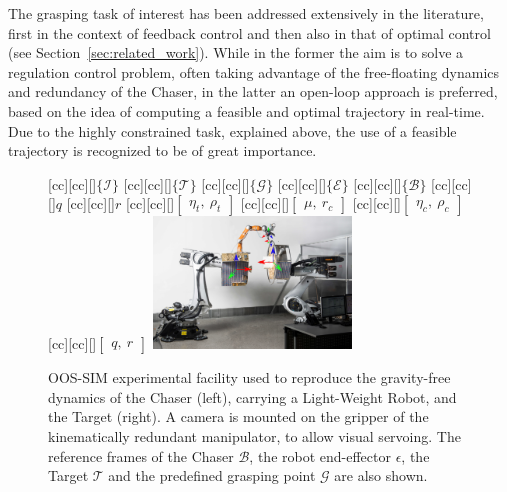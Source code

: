 The grasping task of interest has been addressed extensively in the literature, first in the context of feedback control and then also in that of optimal control (see Section~\ref{sec:related_work}). While in the former the aim is to solve a regulation control problem, often taking advantage of the free-floating dynamics and redundancy of the Chaser, in the latter an open-loop approach is preferred, based on the idea of computing a feasible and optimal trajectory in real-time. Due to the highly constrained task, explained above, the use of a feasible trajectory is recognized to be of great importance.
\begin{figure}[t!]
[cc][cc][\FontFigBBB]{{\color{white}$\{\mathcal{I}\}$}}
[cc][cc][\FontFigBBB]{{\color{black}$\{\mathcal{T}\}$}}
[cc][cc][\FontFigBBB]{{\color{black}$\{\mathcal{G}\}$}}
[cc][cc][\FontFigBBB]{{\color{black}$\{\mathcal{E}\}$}}
[cc][cc][\FontFigBBB]{{\color{white}$\{\mathcal{B}\}$}}
[cc][cc][\FontFigBB]{{\color{black}$q$}}
[cc][cc][\FontFigBB]{{\color{black}$r$}}
[cc][cc][\FontFigBB]{{\color{black}$\begin{bmatrix}\eta_t,~ \rho_t \end{bmatrix}$}}
[cc][cc][\FontFigBB]{{\color{black}$\begin{bmatrix}\mu,~ r_c \end{bmatrix}$}}
[cc][cc][\FontFigBB]{{\color{black}$\begin{bmatrix}\eta_c,~ \rho_c \end{bmatrix}$}}
[cc][cc][\FontFigBB]{{\color{black}$\begin{bmatrix}q,~ r \end{bmatrix}$}}
\centering\includegraphics[angle=0,width=0.47\textwidth]{./figures/motiv}
\caption{OOS-SIM experimental facility used to reproduce the gravity-free dynamics of the Chaser (left), carrying a Light-Weight Robot, and the Target (right). A camera is mounted on the gripper of the kinematically redundant manipulator, to allow visual servoing. The reference frames of the Chaser $\mathcal{B}$, the robot end-effector $\mathcal{\epsilon}$, the Target $\mathcal{T}$ and the predefined grasping point $\mathcal{G}$ are also shown.}
\label{fig:facility}
\end{figure}

